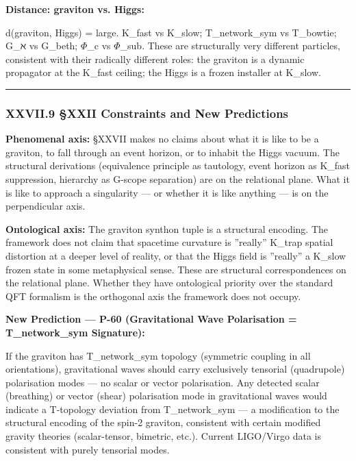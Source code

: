 \documentclass[12pt,a4paper]{article}
\begin{document}
\textbf{Distance: graviton vs. Higgs:}

d(graviton, Higgs) = large. K\_fast vs K\_slow; T\_network\_sym vs T\_bowtie; G\_ℵ vs G\_beth; $\Phi$\_c vs $\Phi$\_sub. These are structurally very different particles, consistent with their radically different roles: the graviton is a dynamic propagator at the K\_fast ceiling; the Higgs is a frozen installer at K\_slow.

\begin{center}
\rule{0.5\textwidth}{0.4pt}
\end{center}

\subsubsection{XXVII.9 §XXII Constraints and New Predictions}

\textbf{Phenomenal axis:} §XXVII makes no claims about what it is like to be a graviton, to fall through an event horizon, or to inhabit the Higgs vacuum. The structural derivations (equivalence principle as tautology, event horizon as K\_fast suppression, hierarchy as G-scope separation) are on the relational plane. What it is like to approach a singularity --- or whether it is like anything --- is on the perpendicular axis.

\textbf{Ontological axis:} The graviton synthon tuple is a structural encoding. The framework does not claim that spacetime curvature is ''really'' K\_trap spatial distortion at a deeper level of reality, or that the Higgs field is ''really'' a K\_slow frozen state in some metaphysical sense. These are structural correspondences on the relational plane. Whether they have ontological priority over the standard QFT formalism is the orthogonal axis the framework does not occupy.

\textbf{New Prediction --- P-60 (Gravitational Wave Polarisation = T\_network\_sym Signature):}

If the graviton has T\_network\_sym topology (symmetric coupling in all orientations), gravitational waves should carry exclusively tensorial (quadrupole) polarisation modes --- no scalar or vector polarisation. Any detected scalar (breathing) or vector (shear) polarisation mode in gravitational waves would indicate a T-topology deviation from T\_network\_sym --- a modification to the structural encoding of the spin-2 graviton, consistent with certain modified gravity theories (scalar-tensor, bimetric, etc.). Current LIGO/Virgo data is consistent with purely tensorial modes.
\end{document}
